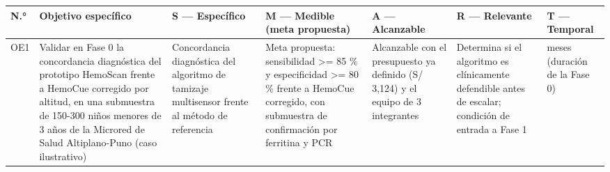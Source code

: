 \documentclass[11pt,a4paper]{article}
\begin{document}
{\small
\begin{longtable}[]{@{}
  >{\raggedright\arraybackslash}p{}
  >{\raggedright\arraybackslash}p{}
  >{\raggedright\arraybackslash}p{}
  >{\raggedright\arraybackslash}p{}
  >{\raggedright\arraybackslash}p{}
  >{\raggedright\arraybackslash}p{}
  >{\raggedright\arraybackslash}p{}@{}}
\toprule\noalign{}
\begin{minipage}[b]{\linewidth}\raggedright
N.°
\end{minipage} & \begin{minipage}[b]{\linewidth}\raggedright
Objetivo específico
\end{minipage} & \begin{minipage}[b]{\linewidth}\raggedright
S --- Específico
\end{minipage} & \begin{minipage}[b]{\linewidth}\raggedright
M --- Medible (meta propuesta)
\end{minipage} & \begin{minipage}[b]{\linewidth}\raggedright
A --- Alcanzable
\end{minipage} & \begin{minipage}[b]{\linewidth}\raggedright
R --- Relevante
\end{minipage} & \begin{minipage}[b]{\linewidth}\raggedright
T --- Temporal
\end{minipage} \\
\midrule\noalign{}
\endhead
\bottomrule\noalign{}
\endlastfoot
OE1 & Validar en Fase 0 la concordancia diagnóstica del prototipo HemoScan frente a HemoCue corregido por altitud, en una submuestra de 150-300 niños menores de 3 años de la Microred de Salud Altiplano-Puno (caso ilustrativo) & Concordancia diagnóstica del algoritmo de tamizaje multisensor frente al método de referencia & Meta propuesta: sensibilidad \textgreater= 85 \% y especificidad \textgreater= 80 \% frente a HemoCue corregido, con submuestra de confirmación por ferritina y PCR & Alcanzable con el presupuesto ya definido (S/ 3,124) y el equipo de 3 integrantes & Determina si el algoritmo es clínicamente defendible antes de escalar; condición de entrada a Fase 1 & 8 meses (duración de la Fase 0) \\

\end{longtable}}
\end{document}
